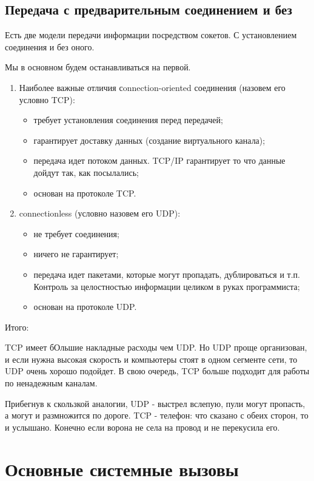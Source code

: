 \subsection{Передача с предварительным соединением и без}

Есть две модели передачи информации посредством сокетов. С установлением соединения и без оного.

Мы в основном будем останавливаться на первой.
\begin{enumerate}
\item Наиболее важные отличия сonnection-oriented соединения (назовем его условно TCP):
\begin{itemize}
\item требует установления соединения перед передачей;
\item гарантирует доставку данных (создание виртуального канала);
\item передача идет потоком данных. TCP/IP гарантирует то что данные дойдут так, как посылались;
\item основан на протоколе TCP.
\end{itemize}
\item connectionless (условно назовем его UDP):
\begin{itemize}
\item не требует соединения;
\item ничего не гарантирует;
\item передача идет пакетами, которые могут пропадать, дублироваться и т.п. Контроль за целостностью информации целиком в руках программиста;
\item основан на протоколе UDP.
\end{itemize}
\end{enumerate}

Итого:

TCP имеет бОльшие накладные расходы чем UDP. Но UDP проще организован, и если нужна высокая скорость и компьютеры стоят в одном сегменте сети, то UDP очень хорошо подойдет. В свою очередь, TCP больше подходит для работы по ненадежным каналам.

Прибегнув к скользкой аналогии,\newline
UDP - выстрел вслепую, пули могут пропасть, а могут и размножится по дороге.\newline
TCP - телефон: что сказано с обеих сторон, то и услышано. Конечно если ворона не села на провод и не перекусила его.

\section{Основные системные вызовы}

